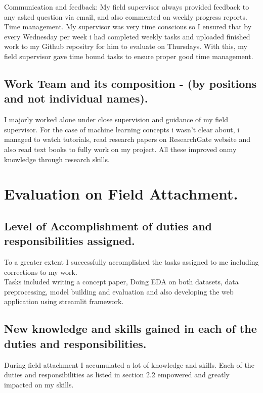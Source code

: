 \documentclass[11pt]{article}
\begin{document}
Communication and feedback: My field supervisor always provided feedback to any asked question via email, and also commented on weekly progress reports.\\

Time management. My supervisor was very time conscious so I ensured that by every Wednesday per week i had completed weekly tasks and uploaded finished work to my Github repositry for him to evaluate on Thursdays. With this, my field supervisor gave time bound tasks to ensure proper good time management.

\subsection{Work Team and its composition - (by positions and not individual names).}
I majorly worked alone under close supervision and guidance of my field supervisor. For the case of machine learning concepts i wasn't clear about, i managed to watch tutorials, read research papers on ResearchGate website and also read text books to fully work on my project. All these improved onmy knowledge through research skills.


\newpage
\section{Evaluation on Field Attachment.}\label{sec:intro}
\subsection{Level of Accomplishment of duties and responsibilities assigned.}
To a greater extent I successfully accomplished the tasks assigned to me including corrections to my work.\\
Tasks included writing a concept paper, Doing EDA on both datasets, data preprocessing, model building and evaluation and also developing the web application using streamlit framework.



\subsection{New knowledge and skills gained in each of the duties and responsibilities.}
During field attachment I accumulated a lot of knowledge and skills. Each of the duties and
responsibilities as listed in section 2.2 empowered and greatly impacted on my skills.\\
\end{document}
